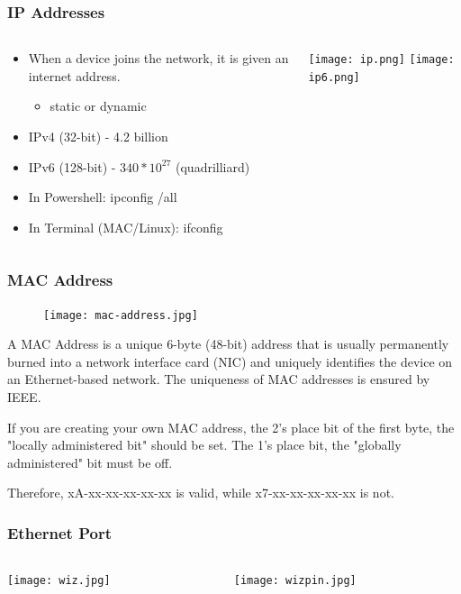 \documentclass{beamer}
\begin{document}
\begin{frame}
\frametitle{IP Addresses}
\begin{columns}
\begin{column}{6cm}
\begin{itemize}
\item When a device joins the network, it is given an internet address.
\begin{itemize}
\item{static or dynamic}
\end{itemize}
\item IPv4 (32-bit) - 4.2 billion
\item IPv6 (128-bit) - $340 * 10^{27}$ (quadrilliard)
\item In Powershell: ipconfig /all
\item In Terminal (MAC/Linux): ifconfig
\end{itemize}
\vspace{1cm} 
\end{column}
\begin{column}{5cm}
\begin{center}
\texttt{[image: ip.png]}
\texttt{[image: ip6.png]}
\end{center}
\end{column}
\end{columns}
\end{frame}

\begin{frame}\frametitle{MAC Address}
\begin{figure}[h]
	\texttt{[image: mac-address.jpg]}
\end{figure}
\hspace{0.50cm}A MAC Address is a unique 6-byte (48-bit) address that is usually permanently burned into a network interface card (NIC) and  uniquely identifies the device on an Ethernet-based network. The uniqueness of MAC addresses is ensured by  IEEE.

\hspace{0.50cm}If you are creating your own MAC address, the 2's place bit of the first byte, the "locally administered bit" should be set. The 1's place bit, the "globally administered" bit must be off.

\vspace{0.25cm}Therefore, xA-xx-xx-xx-xx-xx is valid, while x7-xx-xx-xx-xx-xx is not. 
\end{frame}


\begin{frame}\frametitle{Ethernet Port}
\begin{columns}
\begin{column}{5.5cm}
\begin{center}
\texttt{[image: wiz.jpg]}
\end{center}

\end{column}
\begin{column}{5.5cm}
\begin{center}
\texttt{[image: wizpin.jpg]}
\end{center}
\end{column}
\end{columns}
\end{frame}
\end{document}
